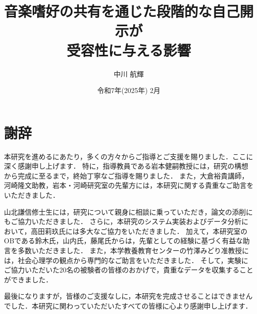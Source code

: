 \documentclass{tpu-sotu}
\author{中川 航輝}
\title{音楽嗜好の共有を通じた段階的な自己開示が\\受容性に与える影響}
\date{令和7年(2025年) 2月}
\begin{document}
\maketitle
\clearpage

\tableofcontents
\clearpage
{}







% 


\chapter*{謝辞}
本研究を進めるにあたり，多くの方々からご指導とご支援を賜りました．ここに深く感謝申し上げます．
特に，指導教員である岩本健嗣教授には，研究の構想から完成に至るまで，終始丁寧なご指導を賜りました．
また，大倉裕貴講師，河崎隆文助教，岩本・河崎研究室の先輩方には，本研究に関する貴重なご助言をいただきました．

山北謙信修士生には，研究について親身に相談に乗っていただき，論文の添削にもご協力いただきました．
さらに，本研究のシステム実装およびデータ分析において，高田莉玖氏には多大なご協力をいただきました．
加えて，本研究室のOBである鈴木氏，山内氏，藤尾氏からは，先輩としての経験に基づく有益な助言を多数いただきました．
また，本学教養教育センターの竹澤みどり准教授には，社会心理学の観点から専門的なご助言をいただきました．
そして，実験にご協力いただいた20名の被験者の皆様のおかげで，貴重なデータを収集することができました．

最後になりますが，皆様のご支援なしに，本研究を完成させることはできませんでした．本研究に関わっていただいたすべての皆様に心より感謝申し上げます．



\newpage
{}




\end{document}
